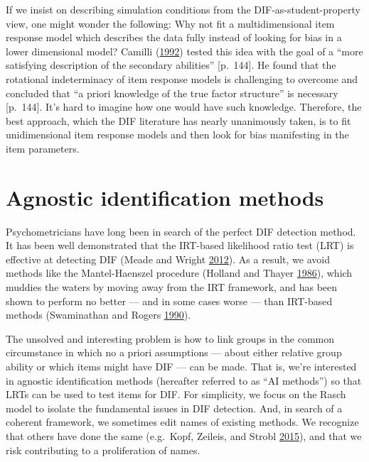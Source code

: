 \documentclass[
  11pt,
]{article}
\begin{document}
If we insist on describing simulation conditions from the DIF-as-student-property view, one might wonder the following: Why not fit a multidimensional item response model which describes the data fully instead of looking for bias in a lower dimensional model? Camilli (\protect\hyperlink{ref-camilli1992conceptual}{1992}) tested this idea with the goal of a \enquote{more satisfying description of the secondary abilities} {[}p.~144{]}. He found that the rotational indeterminacy of item response models is challenging to overcome and concluded that \enquote{a priori knowledge of the true factor structure} is necessary {[}p.~144{]}. It's hard to imagine how one would have such knowledge. Therefore, the best approach, which the DIF literature has nearly unanimously taken, is to fit unidimensional item response models and then look for bias manifesting in the item parameters.

\hypertarget{agnostic-identification-methods}{%
\section{Agnostic identification methods}\label{agnostic-identification-methods}}

Psychometricians have long been in search of the perfect DIF detection method. It has been well demonstrated that the IRT-based likelihood ratio test (LRT) is effective at detecting DIF (Meade and Wright \protect\hyperlink{ref-meade2012solving}{2012}). As a result, we avoid methods like the Mantel-Haenszel procedure (Holland and Thayer \protect\hyperlink{ref-holland1986differential}{1986}), which muddies the waters by moving away from the IRT framework, and has been shown to perform no better --- and in some cases worse --- than IRT-based methods (Swaminathan and Rogers \protect\hyperlink{ref-swaminathan1990detecting}{1990}).

The unsolved and interesting problem is how to link groups in the common circumstance in which no a priori assumptions --- about either relative group ability or which items might have DIF --- can be made. That is, we're interested in agnostic identification methods (hereafter referred to as \enquote{AI methods}) so that LRTs can be used to test items for DIF. For simplicity, we focus on the Rasch model to isolate the fundamental issues in DIF detection. And, in search of a coherent framework, we sometimes edit names of existing methods. We recognize that others have done the same (e.g.~Kopf, Zeileis, and Strobl \protect\hyperlink{ref-kopf2015framework}{2015}), and that we risk contributing to a proliferation of names.
\end{document}
